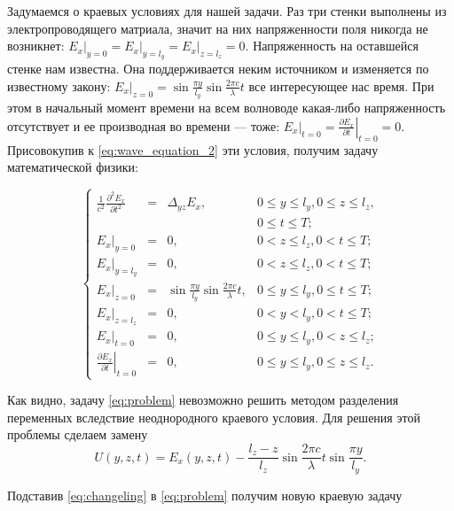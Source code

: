 Задумаемся о краевых условиях для нашей задачи. Раз три стенки выполнены из электропроводящего матриала, значит на них напряженности поля никогда не возникнет: $\left. E_x \right|_{y=0} = \left. E_x \right|_{y=l_y} = \left. E_x \right|_{z=l_z} = 0$. Напряженность на оставшейся стенке нам известна. Она поддерживается неким источником и изменяется по известному закону: $\left. E_x \right|_{z=0} = \sin\frac{\pi y}{l_y} \sin\frac{2 \pi c}{\lambda}t$ все интересующее нас время. При этом в начальный момент времени на всем волноводе какая-либо напряженность отсутствует и ее производная во времени --- тоже: $\left. E_x \right|_{t=0} = \left. \frac{\partial E_x}{\partial t} \right|_{t=0} = 0$. Присовокупив к \eqref{eq:wave_equation_2} эти условия, получим задачу математической физики:

\begin{equation}
  \label{eq:problem}
  \left\{
    \begin{array}{rclr}
      \frac{1}{c^2} \frac{\partial^2 E_x}{\partial t^2} &=& \Delta_{yz} E_x, & 0 \le y \le l_y,  0 \le z \le l_z, \\
      &&& 0 \le t \le T; \\
      \left. E_x \right|_{y=0} & = & 0, & 0 < z \le l_z, 0 < t \le T; \\
      \left. E_x \right|_{y=l_y} & = & 0, & 0 < z \le l_z, 0 < t \le T; \\
      \left. E_x \right|_{z=0} &=&  \sin\frac{\pi y}{l_y} \sin\frac{2 \pi c}{\lambda} t, & 0 \le y \le l_y, 0 \le t \le T; \\
      \left. E_x \right|_{z=l_z} &=& 0, & 0 < y < l_y, 0 < t \le T; \\
      \left. E_x \right|_{t=0} & = & 0, & 0 \le y \le l_y, 0 < z \le l_z; \\
      \left. \frac{\partial E_x}{\partial t} \right|_{t=0} &=& 0, & 0 \le y \le l_y, 0 \le z \le l_z.
    \end{array}
  \right.
\end{equation}

Как видно, задачу \eqref{eq:problem} невозможно решить методом разделения переменных вследствие неоднородного краевого условия. Для решения этой проблемы сделаем замену
\begin{equation}
  \label{eq:changeling}
  U(y, z, t) = E_x(y, z, t) - \frac{l_z - z}{l_z} \sin\frac{2 \pi c}{\lambda}t \sin\frac{\pi y}{l_y}.
\end{equation}

  Подставив \eqref{eq:changeling} в \eqref{eq:problem} получим новую краевую задачу


